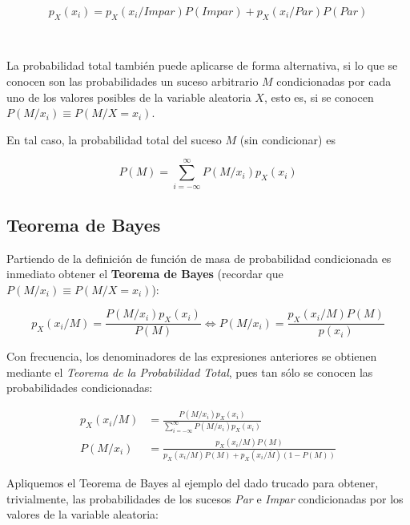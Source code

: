 \documentclass[11pt]{article}
\begin{document}
\[p_X(x_i) = p_X(x_i/Impar)P(Impar) + p_X(x_i/Par)P(Par)\]

    \begin{center}
    \end{center}
    { \hspace*{\fill} \\}
    
    La probabilidad total también puede aplicarse de forma alternativa, si
lo que se conocen son las probabilidades un suceso arbitrario \(M\)
condicionadas por cada uno de los valores posibles de la variable
aleatoria \(X\), esto es, si se conocen \(P(M/x_i)\equiv P(M/X=x_i)\).

En tal caso, la probabilidad total del suceso \(M\) (sin condicionar) es

\[P(M) = \sum_{i=-\infty}^\infty P(M/x_i) p_X(x_i)\]

    \hypertarget{teorema-de-bayes}{%
\subsection*{Teorema de Bayes}\label{teorema-de-bayes}}

Partiendo de la definición de función de masa de probabilidad
condicionada es inmediato obtener el \textbf{Teorema de Bayes} (recordar
que \(P(M/x_i)\equiv P(M/X=x_i)\)):

\[p_X(x_i/M) = \frac{P(M/x_i)p_X(x_i)}{P(M)} \iff P(M/x_i) = \frac{p_X(x_i/M)P(M)}{p(x_i)}\]

Con frecuencia, los denominadores de las expresiones anteriores se
obtienen mediante el \emph{Teorema de la Probabilidad Total}, pues tan
sólo se conocen las probabilidades condicionadas:

\begin{align*}
p_X(x_i/M) &= \frac{P(M/x_i)p_X(x_i)}{\sum_{i=-\infty}^\infty P(M/x_i) p_X(x_i)} \\ 
P(M/x_i) &= \frac{p_X(x_i/M)P(M)}{p_X(x_i/M)P(M)+p_X(x_i/\overline M)(1-P(M))}
\end{align*}

    Apliquemos el Teorema de Bayes al ejemplo del dado trucado para obtener,
trivialmente, las probabilidades de los sucesos \emph{Par} e
\emph{Impar} condicionadas por los valores de la variable aleatoria:
\end{document}
